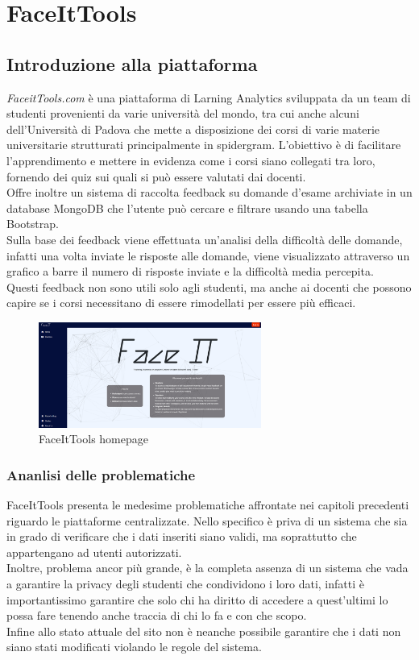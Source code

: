 \chapter{FaceItTools}
\section{Introduzione alla piattaforma}
\textit{FaceitTools.com} è una piattaforma di Larning Analytics sviluppata da un team di studenti provenienti da varie università del mondo, tra cui anche alcuni dell'Università di Padova che mette a disposizione dei corsi di varie materie universitarie strutturati principalmente in spidergram.
L'obiettivo è di facilitare l'apprendimento e mettere in evidenza come i corsi siano collegati tra loro, fornendo dei quiz sui quali si può essere valutati dai docenti.
\\Offre inoltre un sistema di raccolta feedback su domande d'esame archiviate in un database MongoDB che l’utente può cercare e filtrare usando una tabella Bootstrap.
\\Sulla base dei feedback viene effettuata un'analisi della difficoltà delle domande, infatti una volta inviate le risposte alle domande, viene visualizzato attraverso un grafico a barre il numero di risposte inviate e la difficoltà media percepita.
\\Questi feedback non sono utili solo agli studenti, ma anche ai docenti che possono capire se i corsi necessitano di essere rimodellati per essere più efficaci.
\begin{figure}[h]
    \centering
    \includegraphics[width=0.65\textwidth]{Immagini/FaceItTools.PNG}
    \caption{FaceItTools homepage}
\end{figure}
\subsection{Ananlisi delle problematiche}
FaceItTools presenta le medesime problematiche affrontate nei capitoli precedenti riguardo le piattaforme centralizzate.
Nello specifico è priva di un sistema che sia in grado di verificare che i dati inseriti siano validi, ma soprattutto che appartengano ad utenti autorizzati.
\\Inoltre, problema ancor più grande, è la completa assenza di un sistema che vada a garantire la privacy degli studenti che condividono i loro dati, 
infatti è importantissimo garantire che solo chi ha diritto di accedere a quest'ultimi lo possa fare tenendo anche traccia di chi lo fa e con che scopo.
\\Infine allo stato attuale del sito non è neanche possibile garantire che i dati non siano stati modificati violando le regole del sistema.
